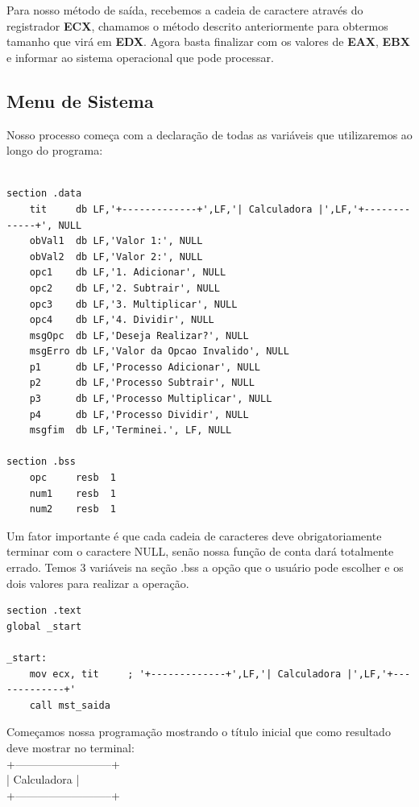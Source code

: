 Para nosso método de saída, recebemos a cadeia de caractere através do registrador \textbf{ECX}, chamamos o método descrito anteriormente para obtermos tamanho que virá em \textbf{EDX}. Agora basta finalizar com os valores de \textbf{EAX}, \textbf{EBX} e informar ao sistema operacional que pode processar.

\subsection{Menu de Sistema}

Nosso processo começa com a declaração de todas as variáveis que utilizaremos ao longo do programa:
\begin{lstlisting}[]
%include 'bibliotecaE.inc'

section .data
	tit     db LF,'+-------------+',LF,'| Calculadora |',LF,'+-------------+', NULL
	obVal1  db LF,'Valor 1:', NULL
	obVal2  db LF,'Valor 2:', NULL
	opc1    db LF,'1. Adicionar', NULL
	opc2    db LF,'2. Subtrair', NULL
	opc3    db LF,'3. Multiplicar', NULL
	opc4    db LF,'4. Dividir', NULL
	msgOpc  db LF,'Deseja Realizar?', NULL
	msgErro db LF,'Valor da Opcao Invalido', NULL
	p1      db LF,'Processo Adicionar', NULL
	p2      db LF,'Processo Subtrair', NULL
	p3      db LF,'Processo Multiplicar', NULL
	p4      db LF,'Processo Dividir', NULL
	msgfim  db LF,'Terminei.', LF, NULL

section .bss
	opc     resb  1
	num1    resb  1
	num2    resb  1
\end{lstlisting}

Um fator importante é que cada cadeia de caracteres deve obrigatoriamente terminar com o caractere NULL, senão nossa função de conta dará totalmente errado. Temos 3 variáveis na seção .bss a opção que o usuário pode escolher e os dois valores para realizar a operação.

\begin{lstlisting}[]
section .text
global _start

_start:
	mov ecx, tit     ; '+-------------+',LF,'| Calculadora |',LF,'+-------------+'
	call mst_saida
\end{lstlisting}

Começamos nossa programação mostrando o título inicial que como resultado deve mostrar no terminal: \\
{\ttfamily +--------------------------+ } \\
{\ttfamily | Calculadora | } \\
{\ttfamily +--------------------------+ }

